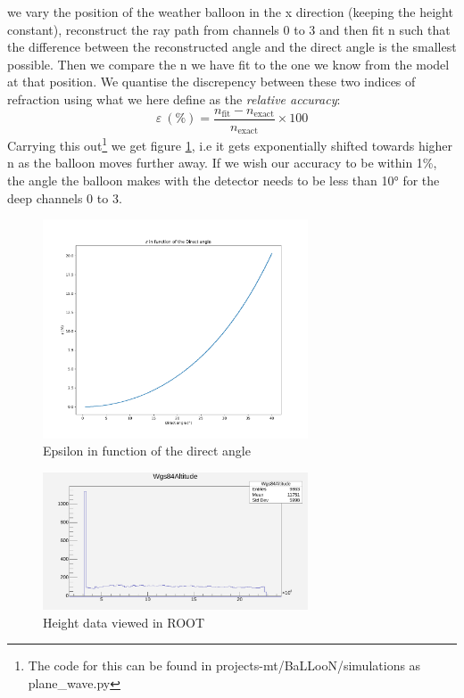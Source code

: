 \documentclass[11pt,a4paper,faculty=we,language=en,doctype=report]{cls/ugent-doc}
\begin{document}
we vary the position of the weather balloon in the x direction (keeping the
height constant), reconstruct the ray path from channels 0 to 3 and then fit n such that the
difference between the reconstructed angle and the direct angle is the smallest
possible.  Then we compare the n we have fit to the one we know from the model
at that position.  We quantise the discrepency between these two indices of
refraction using what we here define as the \textit{relative accuracy}:
\begin{equation}
  \varepsilon\ (\%) = \frac{n_\text{fit} - n_{\text{exact}}}{n_{\text{exact}}} \times 100
\end{equation}
Carrying this out\footnote{The code for this can be found in projects-mt/BaLLooN/simulations as plane\_wave.py} we get figure \ref{fig:EpsilonIFODirect}, i.e it gets
exponentially shifted towards higher n as the balloon moves further away. If we wish our
accuracy to be within 1\%, the angle the balloon makes with the detector needs
to be less than 10° for the deep channels 0 to 3.
\begin{figure}
	\centering
	\includegraphics[width=0.7\textwidth]{EpsilonIFODirect.pdf}
	\caption{Epsilon in function of the direct angle}
	\label{fig:EpsilonIFODirect}
\end{figure}
\begin{figure}
  \centering
  \includegraphics[width=0.7\textwidth]{BobsWeatherBalloonHeight.pdf}
  \caption{Height data viewed in ROOT}
  \label{fig:BobsWeatherBalloonHeight}
\end{figure}
\end{document}

